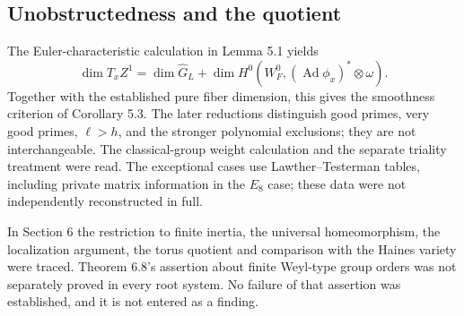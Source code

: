 \documentclass[10pt]{article}
\begin{document}
\subsection*{Unobstructedness and the quotient}
The Euler-characteristic calculation in Lemma 5.1 yields \[\dim T_x Z^1=\dim\widehat G_L+
 \dim H^0(W_F^0,(\operatorname{Ad}\phi_x)^*\otimes\omega).\] Together with the established pure fiber dimension, this gives the smoothness criterion of Corollary 5.3. The later reductions distinguish good primes, very good primes, \(\ell>h\), and the stronger polynomial exclusions; they are not interchangeable. The classical-group weight calculation and the separate triality treatment were read. The exceptional cases use Lawther–Testerman tables, including private matrix information in the \(E_8\) case; these data were not independently reconstructed in full.\par
In Section 6 the restriction to finite inertia, the universal homeomorphism, the localization argument, the torus quotient and comparison with the Haines variety were traced. Theorem 6.8’s assertion about finite Weyl-type group orders was not separately proved in every root system. No failure of that assertion was established, and it is not entered as a finding.\par
\end{document}
